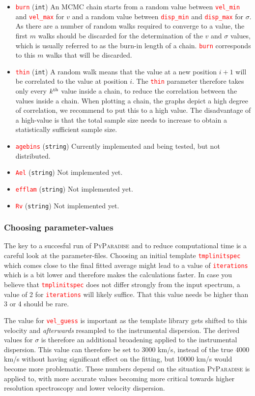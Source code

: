 \documentclass[usenatbib,usegraphicx,useAMS,onecolumn]{mn2e}
\newcommand{\codeline}[1]{\lstinline|#1|}
\newcommand{\paramdef}[1]{\textcolor{red}{\codeline{#1}}}
\begin{document}
\begin{itemize}
    \item \paramdef{burn} (\texttt{int})
        An MCMC chain starts from a random value between \paramdef{vel_min} and \paramdef{vel_max} for $v$ and a random value between \paramdef{disp_min} and \paramdef{disp_max} for $\sigma$.
        As there are a number of random walks required to converge to a value, the first $m$ walks should be discarded for the determination of the $v$ and $\sigma$ values, which is usually referred to as the burn-in length of a chain. \paramdef{burn} corresponds to this $m$ walks that will be discarded.
    \item \paramdef{thin} (\texttt{int})
        A random walk means that the value at a new position $i + 1$ will be correlated to the value at position $i$.
        The \paramdef{thin} parameter therefore takes only every $k^{\rm th}$ value inside a chain, to reduce the correlation between the values inside a chain.
        When plotting a chain, the graphs depict a high degree of correlation, we recommend to put this to a high value.
        The disadvantage of a high-value is that the total sample size needs to increase to obtain a statistically sufficient sample size.
    \item \paramdef{agebins} (\texttt{string})
        Currently implemented and being tested, but not distributed.
    \item \paramdef{Ael} (\texttt{string})
        Not implemented yet.
    \item \paramdef{efflam} (\texttt{string})
        Not implemented yet.
   \item \paramdef{Rv} (\texttt{string})
        Not implemented yet.
\end{itemize}

\subsubsection{Choosing parameter-values}
The key to a succesful run of \textsc{PyParadise} and to reduce computational time is a careful look at the parameter-files.
Choosing an initial template \paramdef{tmplinitspec} which comes close to the final fitted average might lead to a value of \paramdef{iterations} which is a bit lower and therefore makes the calculations faster.
In case you believe that \paramdef{tmplinitspec} does not differ strongly from the input spectrum, a value of 2 for \paramdef{iterations} will likely suffice.
That this value needs be higher than 3 or 4 should be rare.

The value for \paramdef{vel_guess} is important as the template library gets shifted to this velocity and \textit{afterwards} resampled to the instrumental dispersion.
The derived values for $\sigma$ is therefore an additional broadening applied to the instrumental dispersion.
This value can therefore be set to 3000 km/s, instead of the true 4000 km/s without having significant effect on the fitting, but 10000 km/s would become more problematic.
These numbers depend on the situation \textsc{PyParadise} is applied to, with more accurate values becoming more critical towards higher resolution spectroscopy and lower velocity dispersion.
\end{document}
